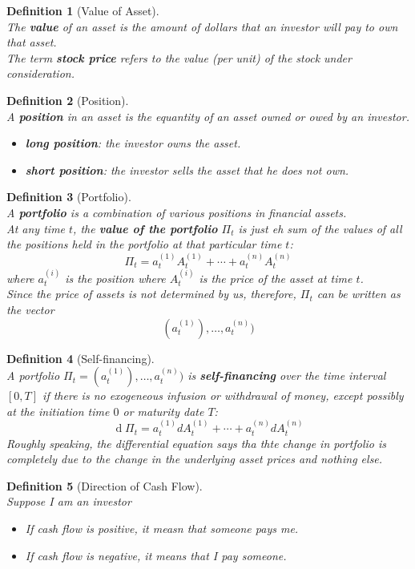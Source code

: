 \documentclass[12pt]{article}
\newtheorem{definition}{Definition}[section]
\theoremstyle{definition}
\DeclareMathOperator{\diff}{d}
\begin{document}
\begin{definition}[Value of Asset]
\hfill\\\normalfont The \textbf{value} of an asset is the amount of dollars that an investor will pay to own that asset.\\
The term \textbf{stock price} refers to the value (per unit) of the stock under consideration.
\end{definition}
\begin{definition}[Position]
\hfill\\\normalfont A \textbf{position} in an asset is the equantity of an asset owned or owed by an investor.
\begin{itemize}
  \item \textbf{long position}: the investor \textit{owns} the asset.
  \item \textbf{short position}: the investor \textit{sells} the asset that he does not own.
\end{itemize}
\end{definition}
\begin{definition}[Portfolio]
\hfill\\\normalfont A \textbf{portfolio} is a combination of various positions in financial assets.\\
At any time $t$, the \textbf{value of the portfolio} $\Pi_t$ is just eh sum of the values of all the positions held in the portfolio at that particular time $t$:
\[
\Pi_t = a_t^{(1)}A_t^{(1)}+\cdots +a_t^{(n)}A_t^{(n)}
\]
where $a_t^{(i)}$ is the position where $A_t^{(i)}$ is the price of the asset at time $t$.\\
Since the price of assets is not determined by us, therefore, $\Pi_t$ can be written as the vector 
\[
(a_t^{(1)}),\ldots, a_t^{(n)})
\]
\end{definition}
\begin{definition}[Self-financing]
\hfill\\\normalfont A portfolio $\Pi_t=(a_t^{(1)}),\ldots, a_t^{(n)})$ is \textbf{self-financing} over the time interval $[0,T]$ if there is \textit{no} exogeneous infusion or withdrawal of money, \textit{except} possibly at the initiation time $0$ or maturity date $T$:
\[
\diff\Pi_t = a_t^{(1)}dA_t^{(1)}+\cdots +a_t^{(n)}dA_t^{(n)}
\]
Roughly speaking, the differential equation says tha thte change in portfolio is completely due to the change in the underlying asset prices and nothing else.
\end{definition}
\begin{definition}[Direction of Cash Flow]
\hfill\\\normalfont Suppose I am an investor
\begin{itemize}
  \item If cash flow is positive, it measn that someone pays me.
  \item If cash flow is negative, it means that I pay someone.
\end{itemize}
\end{definition}
\end{document}
